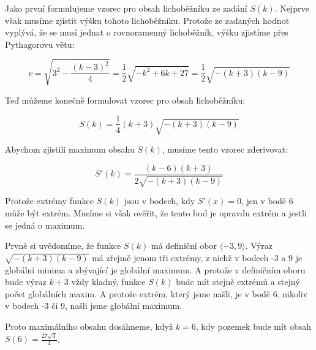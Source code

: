 \documentclass{fkssolpub}
\author{Ondřej Sedláček}
\begin{document}
Jako první formulujeme vzorec pro obsah lichoběžníku ze zadání $S(k)$.
Nejprve však musíme zjistit výšku tohoto lichoběžníku. Protože ze zadaných
hodnot vyplývá, že se musí jednat o rovnoramenný lichoběžník, výšku zjistíme
přes Pythagorovu větu:

\[
	v = \sqrt{3^2 - \frac{(k-3)^2}{4}} = \frac{1}{2} \sqrt{-k^2 + 6k + 27}
	= \frac{1}{2} \sqrt{-(k+3)(k-9)}
\]

Teď můžeme konečně formulovat vzorec pro obsah lichoběžníku:

\[
	S(k) = \frac{1}{4} (k + 3) \sqrt{-(k+3)(k-9)}
\]

Abychom zjistili maximum obsahu $S(k)$, musíme tento vzorec zderivovat:

\[
	S'(k) = \frac{(k - 6)(k + 3)}{2 \sqrt{-(k+3)(k-9)}}
\]

Protože extrémy funkce $S(k)$ jsou v bodech, kdy $S'(x) = 0$, jen v bodě 6 může
být extrém. Musíme si však ověřit, že tento bod je opravdu extrém a jestli se
jedná o maximum.

Prvně si uvědomíme, že funkce $S(k)$ má definiční obor $\langle-3, 9\rangle$.
Výraz $\sqrt{-(k+3)(k-9)}$ má zřejmě jenom tři extrémy, z nichž v bodech -3 a 9
je globální minima a zbývající je globální maximum. A
protože v definičním oboru bude výraz $k + 3$ vždy kladný, funkce $S(k)$ bude mít
stejně extrémů a stejný počet globálních maxim. A protože extrém, který jsme našli,
je v bodě 6, nikoliv v bodech -3 či 9, našli jsme globální maximum.

Proto maximálního obsahu dosáhneme, když $k = 6$, kdy pozemek bude mít obsah
$S(6) = \frac{27 \sqrt{3}}{4}$.
\end{document}
